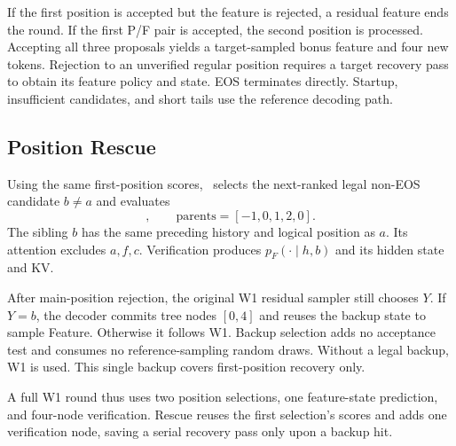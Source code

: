 If the first position is accepted but the feature is rejected, a residual feature ends the round. If the first P/F pair is accepted, the second position is processed. Accepting all three proposals yields a target-sampled bonus feature and four new tokens. Rejection to an unverified regular position requires a target recovery pass to obtain its feature policy and state. EOS terminates directly. Startup, insufficient candidates, and short tails use the reference decoding path.

\subsection{Position Rescue}
Using the same first-position scores, \PF\ selects the next-ranked legal non-EOS candidate $b\ne a$ and evaluates
\begin{equation}
[F_i,a,f,c,b],\qquad \mathrm{parents}=[-1,0,1,2,0].
\label{eq:tree}
\end{equation}
The sibling $b$ has the same preceding history and logical position as $a$. Its attention excludes $a,f,c$. Verification produces $p_F(\cdot\mid h,b)$ and its hidden state and KV.

After main-position rejection, the original W1 residual sampler still chooses $Y$. If $Y=b$, the decoder commits tree nodes $[0,4]$ and reuses the backup state to sample Feature. Otherwise it follows W1. Backup selection adds no acceptance test and consumes no reference-sampling random draws. Without a legal backup, W1 is used. This single backup covers first-position recovery only.

A full W1 round thus uses two position selections, one feature-state prediction, and four-node verification. Rescue reuses the first selection's scores and adds one verification node, saving a serial recovery pass only upon a backup hit.
